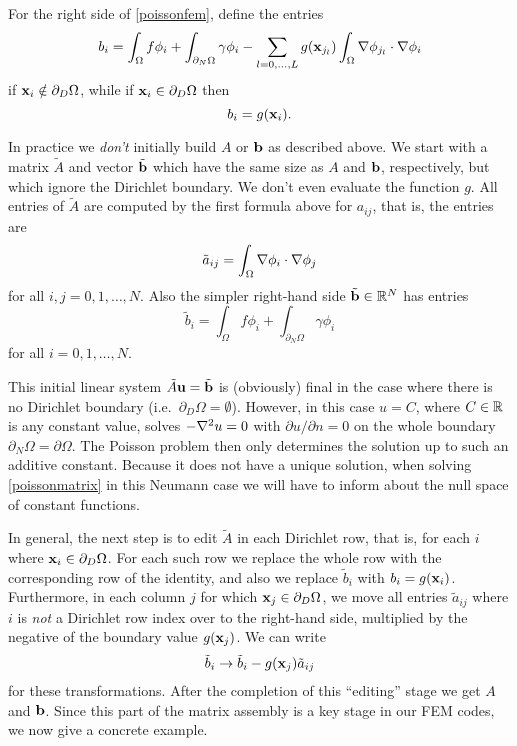 For the right side of \eqref{poissonfem}, define the entries
\begin{equation}
    b_i = \int_\Omega f \phi_i + \int_{\partial_N\Omega} \gamma \phi_i - \sum_{l=0,\dots,L} g(\mathbf{x}_{j_l})  \int_\Omega \nabla \phi_{j_l} \cdot \nabla \phi_i  \label{bentryfem}
\end{equation}
if $\mathbf{x}_i \notin \partial_D \Omega$, while if $\mathbf{x}_i \in \partial_D \Omega$ then
    $$b_i = g(\mathbf{x}_{i}).$$

In practice we \emph{don't} initially build $A$ or $\mathbf{b}$ as described above.  We start with a matrix $\tilde A$ and vector $\tilde {\mathbf{b}}$ which have the same size as $A$ and $\mathbf{b}$, respectively, but which ignore the Dirichlet boundary.  We don't even evaluate the function $g$.  All entries of $\tilde A$ are computed by the first formula above for $a_{ij}$, that is, the entries are
\begin{equation*}
\tilde a_{ij} = \int_\Omega \nabla \phi_i \cdot \nabla \phi_j
\end{equation*}
for all $i,j=0,1,\dots,N$.  Also the simpler right-hand side $\tilde {\mathbf{b}}\in\mathbb{R}^N$ has entries
    $$\tilde b_i = \int_\Omega f \phi_i + \int_{\partial_N\Omega} \gamma \phi_i$$
for all $i=0,1,\dots,N$.

This initial linear system $\tilde A\mathbf{u}=\tilde {\mathbf{b}}$ is (obviously) final in the case where there is no Dirichlet boundary (i.e.~$\partial_D \Omega=\emptyset$).  However, in this case $u=C$, where $C\in\mathbb{R}$ is any constant value, solves $-\nabla^2 u=0$ with $\partial u/\partial n = 0$ on the whole boundary $\partial_N \Omega = \partial \Omega$.  The Poisson problem then only determines the solution up to such an additive constant.  Because it does not have a unique solution, when solving \eqref{poissonmatrix} in this Neumann case we will have to inform \PETSc about the null space of constant functions.

In general, the next step is to edit $\tilde A$ in each Dirichlet row, that is, for each $i$ where $\mathbf{x}_i \in \partial_D \Omega$.  For each such row we replace the whole row with the corresponding row of the identity, and also we replace $\tilde b_i$ with $b_i = g(\mathbf{x}_i)$.  Furthermore, in each column $j$ for which $\mathbf{x}_j \in \partial_D \Omega$, we move all entries $\tilde a_{ij}$ where $i$ is \emph{not} a Dirichlet row index over to the right-hand side, multiplied by the negative of the boundary value $g(\mathbf{x}_{j})$.  We can write
\begin{equation}
    \tilde b_i \to \tilde b_i - g(\mathbf{x}_{j}) \tilde a_{ij} \label{btransform}
\end{equation}
for these transformations.  After the completion of this ``editing'' stage we get $A$ and $\mathbf{b}$.  Since this part of the matrix assembly is a key stage in our FEM codes, we now give a concrete example.

